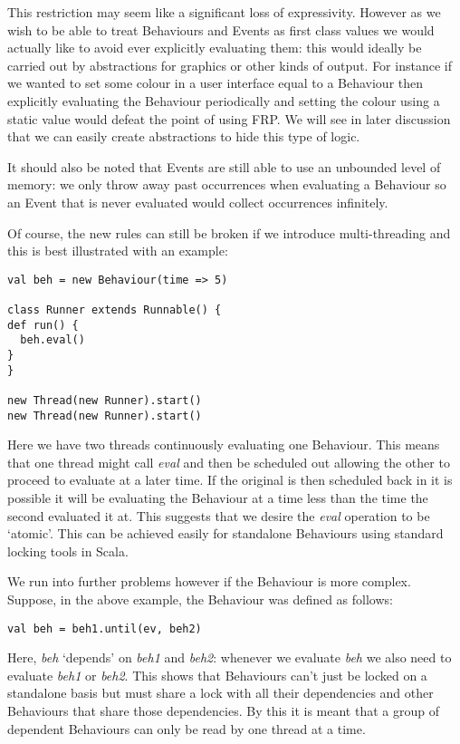     This restriction may seem like a significant loss of expressivity. However as we wish to be able to treat
    Behaviours and Events as first class values we would actually like to avoid ever explicitly evaluating
    them: this would ideally be carried out by abstractions for graphics or other kinds of output. For instance
    if we wanted to set some colour in a user interface equal to a Behaviour then explicitly evaluating the Behaviour
    periodically and setting the colour using a static value would defeat the point of using FRP. We will see in later
    discussion that we can easily create abstractions to hide this type of logic.
    
    It should also be noted that Events are still able to use an unbounded level of memory: we only throw away
    past occurrences when evaluating a Behaviour so an Event that is never evaluated would collect occurrences
    infinitely.
    
    Of course, the new rules can still be broken if we introduce multi-threading and this is best illustrated
    with an example:
    
\begin{verbatim}
val beh = new Behaviour(time => 5)

class Runner extends Runnable() {
def run() {
  beh.eval()
}
}

new Thread(new Runner).start()
new Thread(new Runner).start()
\end{verbatim}       

    Here we have two threads continuously evaluating one Behaviour. This means that one thread
    might call \emph{eval} and then be scheduled out allowing the other to proceed to evaluate
    at a later time. If the original is then scheduled back in it is possible it will
    be evaluating the Behaviour at a time less than the time the second evaluated it at. This suggests
    that we desire the \emph{eval} operation to be `atomic'. This can be achieved easily for standalone
    Behaviours using standard locking tools in Scala.
    
    We run into further problems however if the Behaviour is more complex. Suppose, in the above example,
    the Behaviour was defined as follows:

\begin{verbatim}
val beh = beh1.until(ev, beh2)
\end{verbatim}        

    Here, \emph{beh} `depends' on \emph{beh1} and \emph{beh2}: whenever we evaluate \emph{beh}
    we also need to evaluate \emph{beh1} or \emph{beh2}. This shows that Behaviours can't just
    be locked on a standalone basis but must share a lock with all their dependencies and other Behaviours
    that share those dependencies. By this it is meant that a group of dependent Behaviours can
    only be read by one thread at a time.
    
